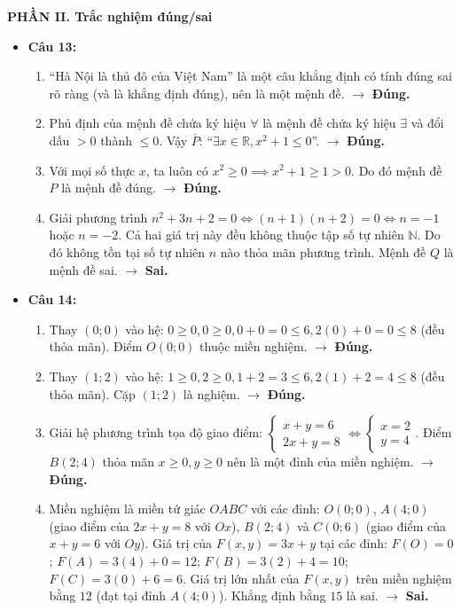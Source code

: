 \documentclass[12pt,a4paper]{article}
\begin{document}
\vspace{0.15cm}
\textbf{PHẦN II. Trắc nghiệm đúng/sai}
\begin{itemize}[leftmargin=0.6cm, itemsep=2pt, topsep=1pt]
    \item \textbf{Câu 13:}
    \begin{enumerate}[label=\alph*), itemsep=1pt]
        \item ``Hà Nội là thủ đô của Việt Nam'' là một câu khẳng định có tính đúng sai rõ ràng (và là khẳng định đúng), nên là một mệnh đề. $\to$ \textbf{Đúng.}
        \item Phủ định của mệnh đề chứa ký hiệu $\forall$ là mệnh đề chứa ký hiệu $\exists$ và đổi dấu $>0$ thành $\le 0$. Vậy $\overline{P}$: ``$\exists x \in \mathbb{R}, x^2 + 1 \le 0$''. $\to$ \textbf{Đúng.}
        \item Với mọi số thực $x$, ta luôn có $x^2 \ge 0 \implies x^2 + 1 \ge 1 > 0$. Do đó mệnh đề $P$ là mệnh đề đúng. $\to$ \textbf{Đúng.}
        \item Giải phương trình $n^2 + 3n + 2 = 0 \iff (n + 1)(n + 2) = 0 \iff n = -1$ hoặc $n = -2$. Cả hai giá trị này đều không thuộc tập số tự nhiên $\mathbb{N}$. Do đó không tồn tại số tự nhiên $n$ nào thỏa mãn phương trình. Mệnh đề $Q$ là mệnh đề sai. $\to$ \textbf{Sai.}
    \end{enumerate}

    \item \textbf{Câu 14:}
    \begin{enumerate}[label=\alph*), itemsep=1pt]
        \item Thay $(0; 0)$ vào hệ: $0 \ge 0, 0 \ge 0, 0 + 0 = 0 \le 6, 2(0) + 0 = 0 \le 8$ (đều thỏa mãn). Điểm $O(0; 0)$ thuộc miền nghiệm. $\to$ \textbf{Đúng.}
        \item Thay $(1; 2)$ vào hệ: $1 \ge 0, 2 \ge 0, 1 + 2 = 3 \le 6, 2(1) + 2 = 4 \le 8$ (đều thỏa mãn). Cặp $(1; 2)$ là nghiệm. $\to$ \textbf{Đúng.}
        \item Giải hệ phương trình tọa độ giao điểm: $\begin{cases} x + y = 6 \\ 2x + y = 8 \end{cases} \iff \begin{cases} x = 2 \\ y = 4 \end{cases}$. Điểm $B(2; 4)$ thỏa mãn $x \ge 0, y \ge 0$ nên là một đỉnh của miền nghiệm. $\to$ \textbf{Đúng.}
        \item Miền nghiệm là miền tứ giác $OABC$ với các đỉnh: $O(0; 0)$, $A(4; 0)$ (giao điểm của $2x + y = 8$ với $Ox$), $B(2; 4)$ và $C(0; 6)$ (giao điểm của $x + y = 6$ với $Oy$). Giá trị của $F(x, y) = 3x + y$ tại các đỉnh:
        $F(O) = 0$; $F(A) = 3(4) + 0 = 12$; $F(B) = 3(2) + 4 = 10$; $F(C) = 3(0) + 6 = 6$.
        Giá trị lớn nhất của $F(x, y)$ trên miền nghiệm bằng $12$ (đạt tại đỉnh $A(4; 0)$). Khẳng định bằng $15$ là sai. $\to$ \textbf{Sai.}
    \end{enumerate}
\end{itemize}
\end{document}
